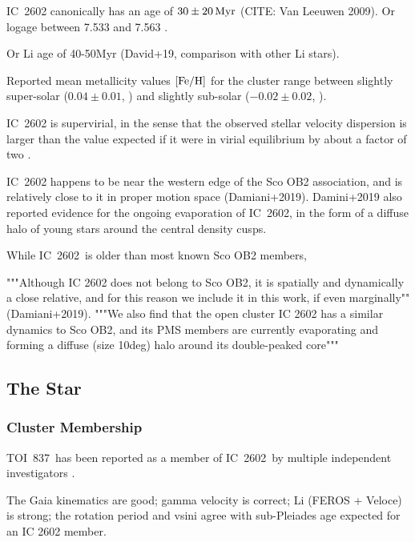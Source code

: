 \documentclass[12pt,twocolumn,tighten]{aastex63}
\newcommand{\tn}{TOI~837} %
\newcommand{\cn}{IC~2602} %
\begin{document}

IC~2602 canonically has an age of $30\pm20\,{\rm Myr}$ (CITE: Van
Leeuwen 2009).
Or logage between 7.533 and 7.563	\citep{bossini_age_2019}.

Or Li age of 40-50Myr (David+19, comparison with other Li stars).

Reported mean metallicity values ${\rm [Fe/H]}$ for the cluster range between
slightly super-solar ($0.04\pm0.01$, \citealt{baratella_gaia-eso_2020}) and
slightly sub-solar ($-0.02 \pm 0.02$, \citealt{netopil_metallicity_2016}).

IC~2602 is supervirial, in the sense that the observed stellar velocity
dispersion is larger than the value expected if it were in virial equilibrium
by about a factor of two \citep{bravi_gaia-eso_2018}.

IC~2602 happens to be near the western edge of the Sco OB2
association, and is relatively close to it in proper motion space
(Damiani+2019).
Damini+2019 also reported evidence for the ongoing evaporation of
\cn, in the form of a diffuse halo of young stars around the central
density cusps.

While \cn\ is older than most known Sco OB2 members,

"""Although IC 2602 does not belong to Sco OB2, it is
spatially and dynamically a close relative, and for this reason
we include it in this work, if even marginally"" (Damiani+2019).
"""We also find that the open cluster IC 2602 has a similar dynamics
to Sco OB2, and its PMS members are currently evaporating and forming
a diffuse (size 10deg) halo around its double-peaked core"""


\subsection{The Star}
\label{subsec:star}
\subsubsection{Cluster Membership}
\label{subsec:member}

\tn\ has been reported as a member of \cn\ by multiple independent 
investigators \citep{Kharchenko_et_al_2013,cantatgaudin_gaia_2018}.


The Gaia kinematics are good; gamma velocity is correct; Li (FEROS +
Veloce) is strong; the rotation period and vsini agree with
sub-Pleiades age expected for an IC 2602 member.
\end{document}
